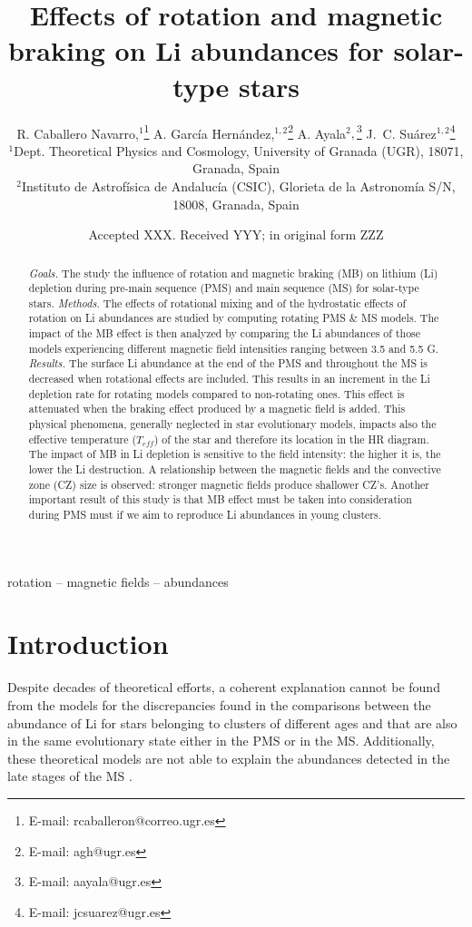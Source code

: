 \documentclass[fleqn,usenatbib]{mnras}
\title[Rotation, magnetic braking \& Li abundances]{Effects of rotation and magnetic braking on Li abundances for solar-type stars}
\author[R. Caballero Navarro et al.]{
R. Caballero Navarro,$^{1}$\thanks{E-mail: rcaballeron@correo.ugr.es}
A. Garc\'ia Hern\'andez,$^{1,2}$\thanks{E-mail: agh@ugr.es}
A. Ayala$^{2},$\thanks{E-mail: aayala@ugr.es}
J.~C. Su\'arez$^{1,2}$\thanks{E-mail: jcsuarez@ugr.es}
\\
$^{1}$Dept. Theoretical Physics and Cosmology, University of Granada (UGR), 18071, Granada, Spain\\
$^{2}$Instituto de Astrof\'isica de Andaluc\'ia (CSIC), Glorieta de la Astronom\'ia S/N, 18008, Granada, Spain\\
}
\date{Accepted XXX. Received YYY; in original form ZZZ}
\begin{document}
\label{firstpage}
\pagerange{\pageref{firstpage}--\pageref{lastpage}}
\maketitle

\begin{abstract}
\textit{Goals.} The study the influence of rotation and magnetic braking (MB) on lithium (Li) depletion during pre-main sequence (PMS) and main sequence (MS) for solar-type stars.
\newline\textit{Methods.} The effects of rotational mixing and of the hydrostatic effects of rotation on Li abundances are studied by computing rotating PMS \& MS models. The impact of the MB effect is then analyzed by comparing the Li abundances of those models experiencing different magnetic field intensities ranging between 3.5 and 5.5 G.
\newline\textit{Results.} The surface Li abundance at the end of the PMS and throughout the MS is decreased when rotational effects are included. This results in an increment in the Li depletion rate for rotating models compared to non-rotating ones. This effect is attenuated when the braking effect produced by a magnetic field is added. This physical phenomena, generally neglected in star evolutionary models, impacts also the effective temperature ($T_{eff}$) of the star and therefore its location in the HR diagram. The impact of MB in Li depletion is sensitive to the field intensity: the higher it is, the lower the Li destruction. A relationship between the magnetic fields and the convective zone (CZ) size is observed: stronger magnetic fields produce shallower CZ's. Another important result of this study is that MB effect must be taken into consideration during PMS must if we aim to reproduce Li abundances in young clusters.
\end{abstract}

\begin{keywords}
rotation -- magnetic fields -- abundances
\end{keywords}



\section{Introduction}
Despite decades of theoretical efforts, a coherent explanation cannot be found from the models for the discrepancies found in the comparisons between the abundance of Li for stars belonging to clusters of different ages and that are also in the same evolutionary state either in the PMS or in the MS. Additionally, these theoretical models are not able to explain the abundances detected in the late stages of the MS \citep{Tschape2001}.\par
\end{document}
